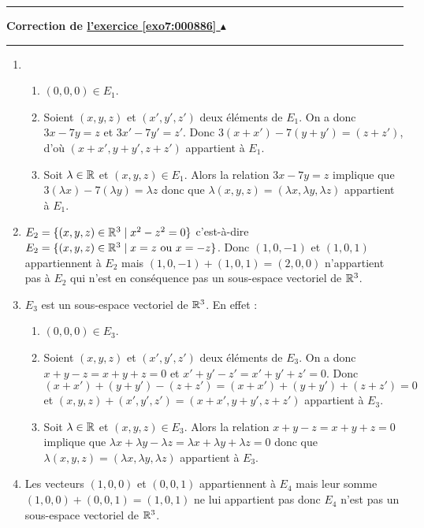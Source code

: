 \documentclass[11pt,a4paper]{article}
\newcounter{exo}
\newcommand{\correction}[1]{\hypertarget{cor7:#1}{}\label{cor7:#1}{\bf Correction de \hyperlink{exo7:#1}{l'exercice \ref{exo7:#1} $\blacktriangle$}}\vspace{1mm}\hrule\vspace{1mm}}
\newcommand{\fincorrection}{\vspace{1mm}\hrule\vspace*{7mm}}
\begin{document}
\fincorrection
\correction{000886}
\begin{enumerate}
  \item 

    \begin{enumerate}
    \item $(0,0,0) \in E_1$.
    \item Soient $(x,y,z)$ et $(x',y',z')$ deux \' el\' ements
de $E_1$. On a donc $3x-7y=z$ et $3x'-7y'=z'$. Donc $3(x+x')-7(y+y')=(z+z')$, d'où $(x+x',y+y',z+z')$  
appartient \`a  $E_1$.

\item Soit $\lambda \in {\mathbb{R}}$ et $(x,y,z)\in E_1$.  Alors la relation $3x-7y=z$ implique
  que $3 (\lambda x) -7(\lambda y)=\lambda z$
  donc que $\lambda(x,y,z)=(\lambda x,\lambda  y,\lambda  z)$ appartient \`a  $E_1$.
    \end{enumerate}


  
  \item $E_2 =\{ (x,y,z)\in {\mathbb{R}}^3 \mid x^2-z^2=0 \} $ c'est-\`a-dire $E_2
    =\{ (x,y,z)\in {\mathbb{R}}^3 \mid x=z \hbox{ ou } x=-z \} $. Donc
    $(1, 0,-1)$ et $(1, 0, 1)$ appartiennent \`a $ E_2$ mais
    $(1, 0,-1)+(1, 0, 1)=(2, 0, 0)$ n'appartient pas \`a $ E_2$ qui n'est en cons\' equence pas un
sous-espace vectoriel de ${\mathbb{R}}^3$.



\item $E_3$ est un sous-espace vectoriel de ${\mathbb{R}}^3$. En effet :
    \begin{enumerate}
    \item $(0, 0, 0) \in E_3$.
    \item Soient $(x, y, z)$ et
      $(x', y', z')$ deux \' el\'ements
      de $E_3$. On a donc $x+y-z=x+y+z=0$ et $x'+y'-z'=x'+y'+z'=0$.
      Donc $(x+x')+(y+y')-(z+z')= (x+x')+(y+y')+(z+z')=0$ et
      $(x, y, z)+(x', y', z')=(x+x',y+y',z+z')$  appartient \`a  $E_3$.
\item Soit $\lambda \in {\mathbb{R}}$ et $(x,y,z)\in E_3$.  Alors la relation $x+y-z=x+y+z=0$ implique
  que $\lambda x+\lambda y-\lambda z=\lambda x+\lambda y+\lambda z=0$
  donc que $\lambda (x, y, z)=(\lambda x,\lambda  y,\lambda  z)$ appartient \`a  $E_3$.
    \end{enumerate}


\item Les vecteurs $(1, 0, 0)$ et
  $(0, 0, 1)$ appartiennent \`a $ E_4$
  mais leur somme $(1, 0, 0)+(0, 0, 1)=(1, 0, 1)$  ne lui
appartient pas donc $E_4$ n'est pas un sous-espace vectoriel de
${\mathbb{R}}^3$.
\end{enumerate}
\end{document}
